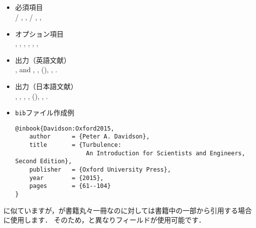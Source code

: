 \documentclass[a4paper,fleqn,uplatex,dvipdfmx]{jsarticle}
\begin{document}
\subsection{\ttinbook}
\label{ssec:inbook}
\begin{screen}
    \begin{itemize}
        \item 必須項目 \\
        \ttauthor / \tteditor, \tttitle, \ttchapter / \ttpages, \ttpublisher, \ttyear
        \item オプション項目 \\
        \ttvolume, \ttseries, \ttaddress, \ttedition, \ttmonth, \ttnote, \ttkey
        \item 出力（英語文献） \\
            \colorbox[gray]{0.8}{\ttauthorf}, \colorbox[gray]{0.8}{\ttauthors} and \colorbox[gray]{0.8}{\ttauthort}, \colorbox[gray]{0.8}{\tttitle}, \colorbox[gray]{0.8}{\ttpublisher} (\colorbox[gray]{0.8}{\ttyear}), \colorbox[gray]{0.8}{\ttpages}, \colorbox[gray]{0.8}{\ttnote}.
        \item 出力（日本語文献） \\
            \colorbox[gray]{0.8}{\ttauthorf}, \colorbox[gray]{0.8}{\ttauthors}, \colorbox[gray]{0.8}{\ttauthort}, \colorbox[gray]{0.8}{\tttitle}, \colorbox[gray]{0.8}{\ttpublisher} (\colorbox[gray]{0.8}{\ttyear}), \colorbox[gray]{0.8}{\ttpages}, \colorbox[gray]{0.8}{\ttnote}.
        \item \verb|bib|ファイル作成例 \vspace{-3mm}
\begin{verbatim}
@inbook{Davidson:Oxford2015,
    author      = {Peter A. Davidson},
    title       = {Turbulence: 
                    An Introduction for Scientists and Engineers, Second Edition},
    publisher   = {Oxford University Press},
    year        = {2015},
    pages       = {61--104}
}
\end{verbatim}
    \end{itemize}
\end{screen}

\hyperref[ssec:book]{\ttbook}に似ていますが，\ttbook が書籍丸々一冊なのに対して\ttinbook は書籍中の一部から引用する場合に使用します．
そのため，\ttbook と異なり\ttpages フィールドが使用可能です．
\end{document}
